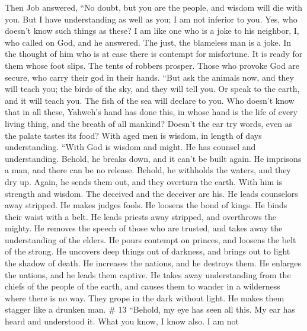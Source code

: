  Then Job answered,  ``No doubt, but you are
the people, and wisdom will die with you.  But I have
understanding as well as you; I am not inferior to you. Yes, who doesn't
know such things as these?  I am like one who is a joke to
his neighbor, I, who called on God, and he answered. The just, the
blameless man is a joke.  In the thought of him who is at
ease there is contempt for misfortune. It is ready for them whose foot
slips.  The tents of robbers prosper. Those who provoke
God are secure, who carry their god in their hands.  ``But
ask the animals now, and they will teach you; the birds of the sky, and
they will tell you.  Or speak to the earth, and it will
teach you. The fish of the sea will declare to you.  Who
doesn't know that in all these, Yahweh's hand has done this,
 in whose hand is the life of every living thing, and the
breath of all mankind?  Doesn't the ear try words, even
as the palate tastes its food?  With aged men is wisdom,
in length of days understanding.  ``With God is wisdom
and might. He has counsel and understanding.  Behold, he
breaks down, and it can't be built again. He imprisons a man, and there
can be no release.  Behold, he withholds the waters, and
they dry up. Again, he sends them out, and they overturn the earth.
 With him is strength and wisdom. The deceived and the
deceiver are his.  He leads counselors away stripped. He
makes judges fools.  He loosens the bond of kings. He
binds their waist with a belt.  He leads priests away
stripped, and overthrows the mighty.  He removes the
speech of those who are trusted, and takes away the understanding of the
elders.  He pours contempt on princes, and loosens the
belt of the strong.  He uncovers deep things out of
darkness, and brings out to light the shadow of death. 
He increases the nations, and he destroys them. He enlarges the nations,
and he leads them captive.  He takes away understanding
from the chiefs of the people of the earth, and causes them to wander in
a wilderness where there is no way.  They grope in the
dark without light. He makes them stagger like a drunken man. \# 13
 ``Behold, my eye has seen all this. My ear has heard and
understood it.  What you know, I know also. I am not
